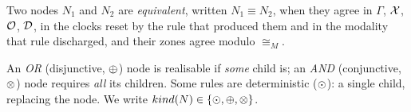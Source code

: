
%


Two nodes $N_1$ and $N_2$ are \emph{equivalent}, written $N_1\equiv N_2$, when they agree in $\Gamma$, $\mathcal{X}$, $\mathcal{O}$, $\mathcal{D}$, in the
clocks reset by the rule that produced them and in the modality that rule discharged, and their
zones agree modulo $\cong_M$.


An \emph{OR} (disjunctive, $\oplus$) node is realisable if
\emph{some} child is; an \emph{AND} (conjunctive, $\otimes$) node requires \emph{all} its children. Some
rules are deterministic ($\odot$): a single child, replacing the node.  We write $kind(N)\in\{\odot,\oplus,\otimes\}$.






